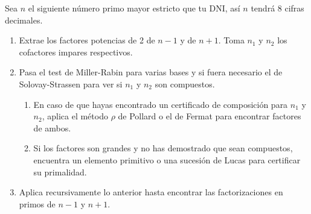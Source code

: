 	Sea $n$ el siguiente número primo mayor estricto que tu DNI, así $n$ tendrá 8 cifras decimales.

	\begin{enumerate}
		\item Extrae los factores potencias de 2 de $n-1$ y de $n+1$. Toma $n_1$ y $n_2$ los cofactores impares
		respectivos.
		\item Pasa el test de Miller-Rabin para varias bases y si fuera necesario el de Solovay-Strassen para ver
		si $n_1$ y $n_2$ son compuestos.
		\begin{enumerate}
			\item En caso de que hayas encontrado un certificado de composición para $n_1$ y $n_2$, aplica el método
			$\rho$ de Pollard o el de Fermat para encontrar factores de ambos.
			\item Si los factores son grandes y no has demostrado que sean compuestos, encuentra un elemento primitivo
			o una sucesión de Lucas para certificar su primalidad.
		\end{enumerate}
		\item Aplica recursivamente lo anterior hasta encontrar las factorizaciones en primos de $n-1$ y $n+1$.
	\end{enumerate}

